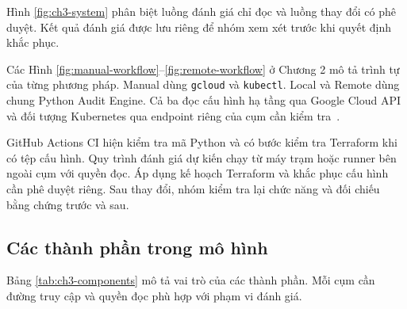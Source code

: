 Hình \ref{fig:ch3-system} phân biệt luồng đánh giá chỉ đọc và luồng thay đổi có phê duyệt. Kết quả đánh giá được lưu riêng để nhóm xem xét trước khi quyết định khắc phục.


Các Hình \ref{fig:manual-workflow}--\ref{fig:remote-workflow} ở Chương 2 mô tả trình tự của từng phương pháp. Manual dùng \texttt{gcloud} và \texttt{kubectl}. Local và Remote dùng chung Python Audit Engine. Cả ba đọc cấu hình hạ tầng qua Google Cloud API và đối tượng Kubernetes qua endpoint riêng của cụm cần kiểm tra~\mbox{\parencite{project-overview}}.

GitHub Actions CI hiện kiểm tra mã Python và có bước kiểm tra Terraform khi có tệp cấu hình. Quy trình đánh giá dự kiến chạy từ máy trạm hoặc runner bên ngoài cụm với quyền đọc. Áp dụng kế hoạch Terraform và khắc phục cấu hình cần phê duyệt riêng. Sau thay đổi, nhóm kiểm tra lại chức năng và đối chiếu bằng chứng trước và sau.

\subsection{Các thành phần trong mô hình}

Bảng \ref{tab:ch3-components} mô tả vai trò của các thành phần. Mỗi cụm cần đường truy cập và quyền đọc phù hợp với phạm vi đánh giá.

